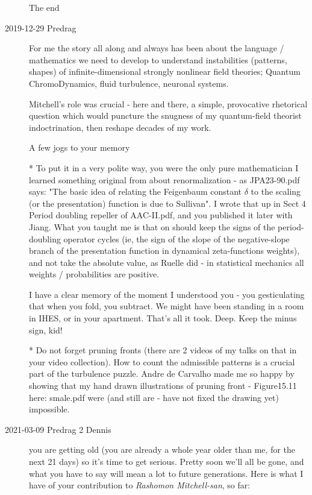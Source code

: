 \begin{description}
\begin{center}
The end
\end{center}

\item[2019-12-29 Predrag]
For me the story all along and always has been about the language /
mathematics we need to develop to understand instabilities (patterns,
shapes) of infinite-dimensional strongly nonlinear field theories;
Quantum ChromoDynamics, fluid turbulence, neuronal systems.

Mitchell's role was crucial - here and there, a simple, provocative
rhetorical question which would puncture the snugness of my quantum-field
theorist indoctrination, then reshape decades of my work.

A few jogs to your memory

* To put it in a very polite way, you were the only pure mathematician I
learned something original from about renormalization - as
 {JPA23-90.pdf}
says: "The basic idea of relating the Feigenbaum constant $\delta$ to the
scaling (or the presentation) function is due to Sullivan". I wrote that
up in Sect 4 Period doubling repeller of
 {AAC-II.pdf}, and
you published it later with Jiang. What you taught me is that on should
keep the signs of the period-doubling operator cycles (ie, the sign of
the slope of the negative-slope branch of the presentation function in
dynamical zeta-functions weights), and not take the absolute value, as
Ruelle did - in statistical mechanics all weights / probabilities are
positive.

I have a clear memory of the moment I understood you - you gesticulating
that when you fold, you subtract. We might have been standing in a room
in IHES, or in your apartment. That's all it took. Deep. Keep the minus
sign, kid!

* Do not forget pruning fronts (there are 2 videos of my talks on that in
your video collection). How to count the admissible patterns is a crucial
part of the turbulence puzzle. Andre de Carvalho made me so happy by
showing that my hand drawn illustrations of pruning front -  Figure15.11
here:  {smale.pdf} were
(and still are - have not fixed the drawing yet) impossible.

\item[2021-03-09 Predrag 2 Dennis]
you are getting old (you are already a whole year older than me, for the
next 21 days) so it's time to get serious. Pretty soon we'll all be gone,
and what you have to say will mean a lot to future generations. Here is
what I have of your contribution to \emph{Rashomon Mitchell-san}, so far:


\end{description}
